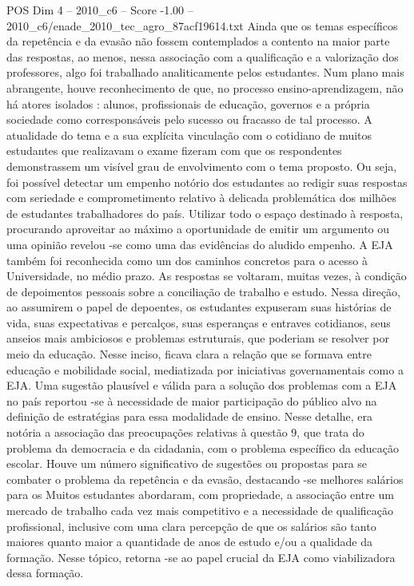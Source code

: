 \begin{textsample}{POS Dim 4 – 2010\_c6 – Score -1.00 – 2010\_c6/enade\_2010\_tec\_agro\_87acf19614.txt}
Ainda que os temas específicos da repetência e da evasão não fossem contemplados a contento na maior parte das respostas, ao menos, nessa associação com a qualificação e a valorização dos professores, algo foi trabalhado analiticamente pelos estudantes.
Num plano mais abrangente, houve reconhecimento de que, no processo ensino-aprendizagem, não há atores isolados : alunos, profissionais de educação, governos e a própria sociedade como corresponsáveis pelo sucesso ou fracasso de tal processo.
A atualidade do tema e a sua explícita vinculação com o cotidiano de muitos estudantes que realizavam o exame fizeram com que os respondentes demonstrassem um visível grau de envolvimento com o tema proposto.
Ou seja, foi possível detectar um empenho notório dos estudantes ao redigir suas respostas com seriedade e comprometimento relativo à delicada problemática dos milhões de estudantes trabalhadores do país.
Utilizar todo o espaço destinado à resposta, procurando aproveitar ao máximo a oportunidade de emitir um argumento ou uma opinião revelou -se como uma das evidências do aludido empenho.
A EJA também foi reconhecida como um dos caminhos concretos para o acesso à Universidade, no médio prazo.
As respostas se voltaram, muitas vezes, à condição de depoimentos pessoais sobre a conciliação de trabalho e estudo.
Nessa direção, ao assumirem o papel de depoentes, os estudantes expuseram suas histórias de vida, suas expectativas e percalços, suas esperanças e entraves cotidianos, seus anseios mais ambiciosos e problemas estruturais, que poderiam se resolver por meio da educação.
Nesse inciso, ficava clara a relação que se formava entre educação e mobilidade social, mediatizada por iniciativas governamentais como a EJA.
Uma sugestão plausível e válida para a solução dos problemas com a EJA no país reportou -se à necessidade de maior participação do público alvo na definição de estratégias para essa modalidade de ensino.
Nesse detalhe, era notória a associação das preocupações relativas à questão 9, que trata do problema da democracia e da cidadania, com o problema específico da educação escolar.
Houve um número significativo de sugestões ou propostas para se combater o problema da repetência e da evasão, destacando -se melhores salários para os Muitos estudantes abordaram, com propriedade, a associação entre um mercado de trabalho cada vez mais competitivo e a necessidade de qualificação profissional, inclusive com uma clara percepção de que os salários são tanto maiores quanto maior a quantidade de anos de estudo e/ou a qualidade da formação.
Nesse tópico, retorna -se ao papel crucial da EJA como viabilizadora dessa formação.

\end{textsample}
